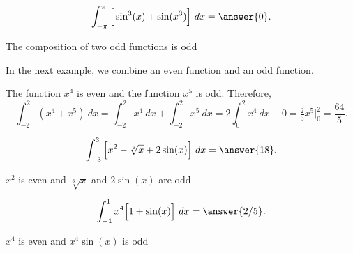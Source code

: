 \documentclass{ximera}
\begin{document}
\begin{problem}
\[\int_{-\pi}^\pi \Big[\sin^3(x) + \sin(x^3)\Big] \ dx =\answer {0}.\]
\begin{hint}
The composition of two odd functions is odd
\end{hint}
\end{problem}


In the next example, we combine an even function and an odd function.

\begin{example}
The function $x^4$ is even and the function $x^5$ is odd.  Therefore,
\[\int_{-2}^2 (x^4 + x^5) \ dx = \int_{-2}^2 x^4 \ dx + \int_{-2}^2 x^5 \ dx = 2\int_0^2 x^4 \ dx + 0 = \tfrac{2}{5}x^5\Bigg|_0^2 = \frac{64}{5}.\]
\end{example}

\begin{problem}
\[\int_{-3}^3 \Big[x^2 - \sqrt[3]x +2\sin(x) \Big] \ dx =\answer {18}.\]
\begin{hint}
$x^2$ is even and $\sqrt[3]x$ and $2\sin(x)$ are odd
\end{hint}
\end{problem}

\begin{problem}
\[\int_{-1}^{1} x^4\Big[1 + \sin(x)\Big] \ dx =\answer {2/5}.\]
\begin{hint}
$x^4$ is even and $x^4\sin(x)$ is odd
\end{hint}
\end{problem}
\end{document}
